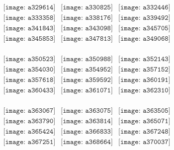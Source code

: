 \documentclass{article}
\begin{document}
\begin{figure}[H]
 \begin{center}$
 \begin{array}{cccc}
\texttt{[image: a329614]}&\texttt{[image: a330825]}&\texttt{[image: a332446]}\\\texttt{[image: a333358]}&\texttt{[image: a338176]}&\texttt{[image: a339492]}\\\texttt{[image: a341843]}&\texttt{[image: a343098]}&\texttt{[image: a345705]}\\\texttt{[image: a345853]}&\texttt{[image: a347813]}&\texttt{[image: a349068]}\\
\end{array}$
\end{center}
\end{figure}

\begin{figure}[H]
 \begin{center}$
 \begin{array}{cccc}
\texttt{[image: a350523]}&\texttt{[image: a350988]}&\texttt{[image: a352143]}\\\texttt{[image: a354030]}&\texttt{[image: a354952]}&\texttt{[image: a357152]}\\\texttt{[image: a357618]}&\texttt{[image: a359592]}&\texttt{[image: a360191]}\\\texttt{[image: a360433]}&\texttt{[image: a361071]}&\texttt{[image: a362310]}\\
\end{array}$
\end{center}
\end{figure}

\begin{figure}[H]
 \begin{center}$
 \begin{array}{cccc}
\texttt{[image: a363067]}&\texttt{[image: a363075]}&\texttt{[image: a363505]}\\\texttt{[image: a363790]}&\texttt{[image: a363814]}&\texttt{[image: a365071]}\\\texttt{[image: a365424]}&\texttt{[image: a366833]}&\texttt{[image: a367248]}\\\texttt{[image: a367251]}&\texttt{[image: a368664]}&\texttt{[image: a370037]}\\
\end{array}$
\end{center}
\end{figure}
\end{document}
